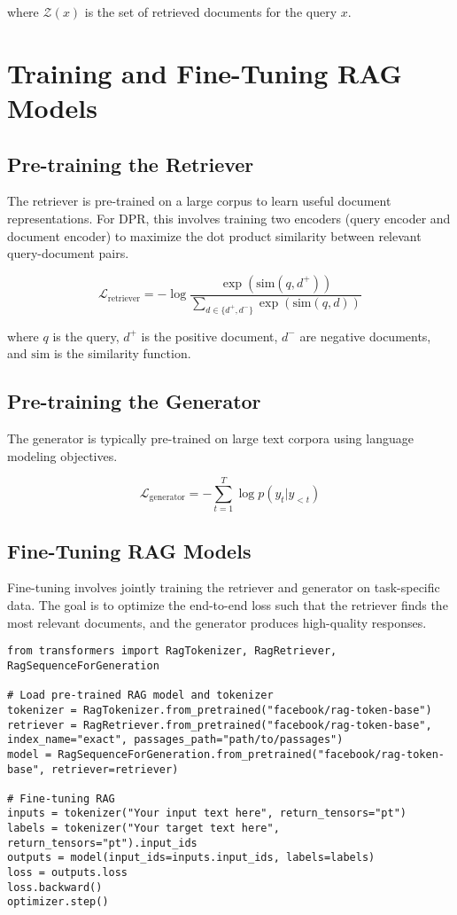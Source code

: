 where \( \mathcal{Z}(x) \) is the set of retrieved documents for the query \( x \).

\section{Training and Fine-Tuning RAG Models}

\subsection{Pre-training the Retriever}
The retriever is pre-trained on a large corpus to learn useful document representations. For DPR, this involves training two encoders (query encoder and document encoder) to maximize the dot product similarity between relevant query-document pairs.

\begin{equation}
\mathcal{L}_{\text{retriever}} = - \log \frac{\exp(\text{sim}(q, d^+))}{\sum_{d \in \{d^+, d^-\}} \exp(\text{sim}(q, d))}
\end{equation}

where \( q \) is the query, \( d^+ \) is the positive document, \( d^- \) are negative documents, and \( \text{sim} \) is the similarity function.

\subsection{Pre-training the Generator}
The generator is typically pre-trained on large text corpora using language modeling objectives.

\begin{equation}
\mathcal{L}_{\text{generator}} = - \sum_{t=1}^T \log p(y_t | y_{<t})
\end{equation}

\subsection{Fine-Tuning RAG Models}
Fine-tuning involves jointly training the retriever and generator on task-specific data. The goal is to optimize the end-to-end loss such that the retriever finds the most relevant documents, and the generator produces high-quality responses.

\begin{verbatim}
from transformers import RagTokenizer, RagRetriever, RagSequenceForGeneration

# Load pre-trained RAG model and tokenizer
tokenizer = RagTokenizer.from_pretrained("facebook/rag-token-base")
retriever = RagRetriever.from_pretrained("facebook/rag-token-base", index_name="exact", passages_path="path/to/passages")
model = RagSequenceForGeneration.from_pretrained("facebook/rag-token-base", retriever=retriever)

# Fine-tuning RAG
inputs = tokenizer("Your input text here", return_tensors="pt")
labels = tokenizer("Your target text here", return_tensors="pt").input_ids
outputs = model(input_ids=inputs.input_ids, labels=labels)
loss = outputs.loss
loss.backward()
optimizer.step()
\end{verbatim}

